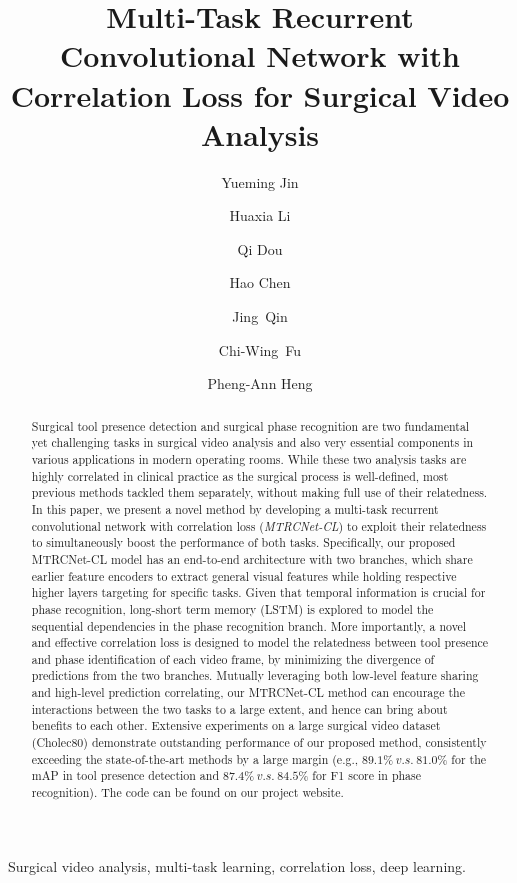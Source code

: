 \documentclass{elsarticle}
\begin{document}
\begin{frontmatter}

\title{Multi-Task Recurrent Convolutional Network with Correlation Loss for Surgical Video Analysis}


\author[firstadd]{Yueming Jin}
\author[firstadd]{Huaxia Li}
\author[firstadd]{Qi Dou}
\author[firstadd,senadd]{Hao Chen}
\author[thirdadd]{Jing~Qin}
\author[firstadd]{Chi-Wing~Fu}
\author[firstadd]{Pheng-Ann Heng}
\address[firstadd]{Department of Computer Science and Engineering, The Chinese University of Hong Kong}
\address[senadd]{Imsight Medical Technology, Co, Ltd, China}
\address[thirdadd]{Centre for Smart Health, School of Nursing, The Hong Kong Polytechnic University}



\begin{abstract}
Surgical tool presence detection and surgical phase recognition are two fundamental yet challenging tasks in surgical video analysis and also very essential components in various applications in modern operating rooms. While these two analysis tasks are highly correlated in clinical practice as the surgical process is well-defined, most previous methods tackled them separately, without making full use of their relatedness. In this paper, we present a novel method by developing a multi-task recurrent convolutional network with correlation loss (\emph{MTRCNet-CL}) to exploit their relatedness to simultaneously boost the performance of both tasks. Specifically, our proposed MTRCNet-CL model has an end-to-end architecture with two branches, which share earlier feature encoders to extract general visual features while holding respective higher layers targeting for specific tasks. Given that temporal information is crucial for phase recognition, long-short term memory (LSTM) is explored to model the sequential dependencies in the phase recognition branch. More importantly, a novel and effective correlation loss is designed to model the relatedness between tool presence and phase identification of each video frame, by minimizing the divergence of predictions from the two branches. Mutually leveraging both low-level feature sharing and high-level prediction correlating, our MTRCNet-CL method can encourage the interactions between the two tasks to a large extent, and hence can bring about benefits to each other. Extensive experiments on a large surgical video dataset (Cholec80) demonstrate outstanding performance of our proposed method, consistently exceeding the state-of-the-art methods by a large margin (e.g., $89.1\% ~v.s.~ 81.0\%$ for the mAP in tool presence detection and $87.4\%~v.s.~84.5\%$ for F1 score in phase recognition). The code can be found on our project website.



\end{abstract}

\begin{keyword}
Surgical video analysis, multi-task learning, correlation loss, deep learning.
\end{keyword}

\end{frontmatter}
\end{document}
